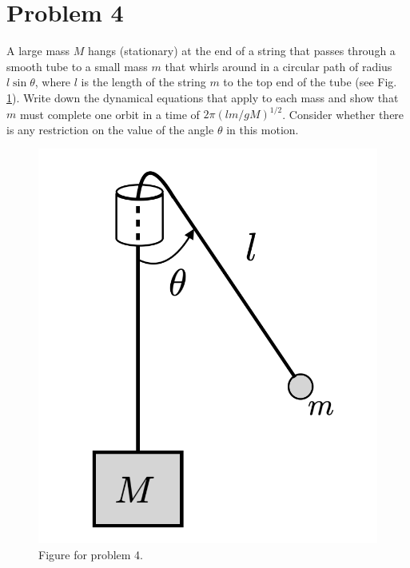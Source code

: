 \documentclass[12pt]{article}
\begin{document}
\section*{Problem 4}
A large mass $M$ hangs (stationary) at the end of a string that passes through a smooth tube to a small mass $m$ that whirls around in a circular path of radius $l\sin\theta$, where $l$ is the length of the string $m$ to the top end of the tube (see Fig. \ref{fig2}). Write down the dynamical equations that apply to each mass and show that $m$ must complete one orbit in a time of $2\pi(lm/gM)^{1/2}$. Consider whether there is any restriction on the value of the angle $\theta$ in this motion.
\begin{figure}
\center
\includegraphics[scale=0.5]{rotate}
\caption{Figure for problem 4.}\label{fig2}
\end{figure}
\end{document}
